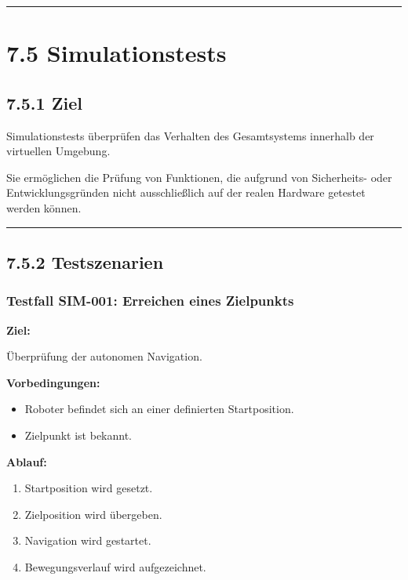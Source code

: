 \documentclass[
  a4paper,
  12pt,
  DIV=12,        %
  parskip=half,  %
  headings=small %
]{scrartcl}
\theoremstyle{definition}
\providecommand{\tightlist}{%
  \setlength{\itemsep}{0pt}\setlength{\parskip}{0pt}}
\theoremstyle{definition}
\providecommand{\tightlist}{%
  \setlength{\itemsep}{0pt}\setlength{\parskip}{0pt}}
\begin{document}
\begin{center}\rule{0.5\linewidth}{0.5pt}\end{center}

\section{7.5 Simulationstests}\label{simulationstests}

\subsection{7.5.1 Ziel}\label{ziel-2}

Simulationstests überprüfen das Verhalten des Gesamtsystems innerhalb
der virtuellen Umgebung.

Sie ermöglichen die Prüfung von Funktionen, die aufgrund von
Sicherheits- oder Entwicklungsgründen nicht ausschließlich auf der
realen Hardware getestet werden können.

\begin{center}\rule{0.5\linewidth}{0.5pt}\end{center}

\subsection{7.5.2 Testszenarien}\label{testszenarien}

\subsubsection{Testfall SIM-001: Erreichen eines
Zielpunkts}\label{testfall-sim-001-erreichen-eines-zielpunkts}

\textbf{Ziel:}

Überprüfung der autonomen Navigation.

\textbf{Vorbedingungen:}

\begin{itemize}
\tightlist
\item
  Roboter befindet sich an einer definierten Startposition.
\item
  Zielpunkt ist bekannt.
\end{itemize}

\textbf{Ablauf:}

\begin{enumerate}
\def\labelenumi{\arabic{enumi}.}
\tightlist
\item
  Startposition wird gesetzt.
\item
  Zielposition wird übergeben.
\item
  Navigation wird gestartet.
\item
  Bewegungsverlauf wird aufgezeichnet.
\end{enumerate}
\end{document}
